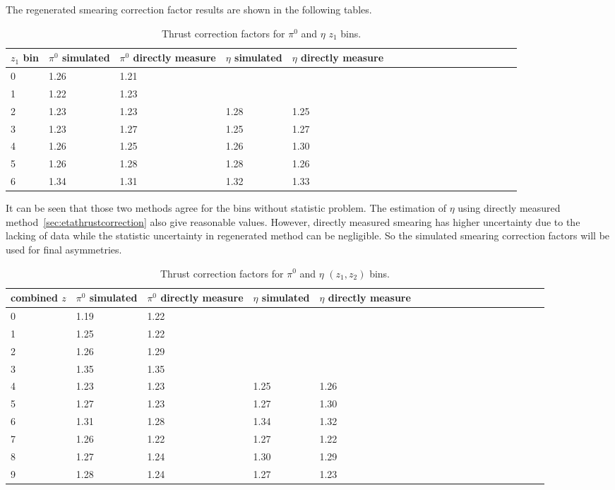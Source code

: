 The regenerated smearing correction factor results are shown in the following tables.%
\begin{table}[H]\footnotesize
\centering
\begin{tabular}{|l|l|l|l|l|l|l|l|l|l|l|l|l|l|l|l|l|l|}
\hline
$z_1$ bin & $\pi^0$ simulated & $\pi^0$ directly measure & $\eta$ simulated  & $\eta$ directly measure  \\ \hline
0	&	1.26	&	1.21	&		&		\\ \hline
1	&	1.22	&	1.23	&		&		\\ \hline
2	&	1.23	&	1.23	&	1.28	&	1.25	\\ \hline
3	&	1.23	&	1.27	&	1.25	&	1.27	\\ \hline
4	&	1.26	&	1.25	&	1.26	&	1.30	\\ \hline
5	&	1.26	&	1.28	&	1.28	&	1.26	\\ \hline
6	&	1.34	&	1.31	&	1.32	&	1.33	\\ \hline
\end{tabular}
\caption{Thrust correction factors for $\pi^0$ and $\eta$ $z_1$ bins.}
\label{tab:sinzthrustfactor_compare}
\end{table}
It can be seen that those two methods agree for the bins without statistic problem. The estimation of $\eta$ using directly measured method~\ref{sec:etathrustcorrection} also give reasonable values. However, directly measured smearing has higher uncertainty due to the lacking of data while the statistic uncertainty in regenerated method can be negligible. So the simulated smearing correction factors will be used for final asymmetries. 
\begin{table}[H]\footnotesize
\centering
\begin{tabular}{|l|l|l|l|l|l|l|l|l|l|l|l|l|l|l|l|l|l|}
\hline
combined $z$ & $\pi^0$ simulated & $\pi^0$ directly measure & $\eta$ simulated  & $\eta$ directly measure  \\ \hline
0	&	1.19	&	1.22	&		&		\\ \hline
1	&	1.25	&	1.22	&		&		\\ \hline
2	&	1.26	&	1.29	&		&		\\ \hline
3	&	1.35	&	1.35	&		&		\\ \hline
4	&	1.23	&	1.23	&	1.25	&	1.26	\\ \hline
5	&	1.27	&	1.23	&	1.27	&	1.30	\\ \hline
6	&	1.31	&	1.28	&	1.34	&	1.32	\\ \hline
7	&	1.26	&	1.22	&	1.27	&	1.22	\\ \hline
8	& 	1.27	&	1.24	&	1.30	&	1.29	\\ \hline
9	&	1.28	&	1.24	&	1.27	&	1.23	\\ \hline
\end{tabular}
\caption{Thrust correction factors for $\pi^0$ and $\eta$ $(z_1,z_2)$ bins.}
\label{tab:comzthrustfactor_compare}
\end{table}
